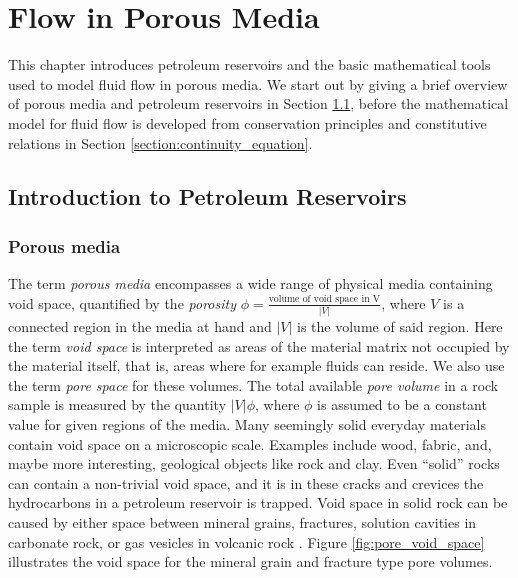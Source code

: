 \chapter{Flow in Porous Media} \thispagestyle{chapterpage}
\label{chapter:flow_porous_media}
This chapter introduces petroleum reservoirs and the basic mathematical tools used to model fluid flow in porous media. We start out by giving a brief overview of porous media and petroleum reservoirs in Section \ref{section:introduction_petroleum_reservoirs}, before the mathematical model for fluid flow is developed from conservation principles and constitutive relations in Section \ref{section:continuity_equation}.

\section{Introduction to Petroleum Reservoirs}
\label{section:introduction_petroleum_reservoirs}

\subsection{Porous media}
The term \emph{porous media} encompasses a wide range of physical media containing void space, quantified by the \emph{porosity} $\phi = \frac{\text{volume of void space in V}}{|V|}$, where $V$ is a connected region in the media at hand and $\vert V \vert$ is the volume of said region. Here the term \emph{void space} is interpreted as areas of the material matrix not occupied by the material itself, that is, areas where for example fluids can reside.  We also use the term \emph{pore space} for these volumes. The total available \emph{pore volume} in a rock sample is measured by the quantity $\vert V \vert\phi$, where $\phi$ is assumed to be a constant value for given regions of the media. Many seemingly solid everyday materials contain void space on a microscopic scale. Examples include wood, fabric, and, maybe more interesting, geological objects like rock and clay. Even ``solid'' rocks can contain a non-trivial void space, and it is in these cracks and crevices the hydrocarbons in a petroleum reservoir is trapped. Void space in solid rock can be caused by either space between mineral grains, fractures, solution cavities in carbonate rock, or gas vesicles in volcanic rock \citep{jain_ch._2013}. Figure \ref{fig:pore_void_space} illustrates the void space for the mineral grain and fracture type pore volumes.

